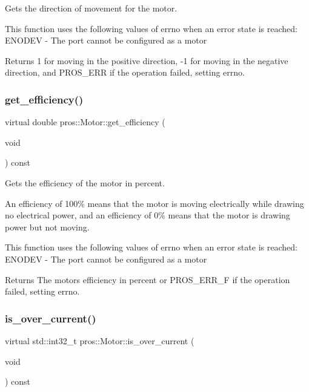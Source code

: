 Gets the direction of movement for the motor. 

This function uses the following values of errno when an error state is reached\+: E\+N\+O\+D\+EV -\/ The port cannot be configured as a motor

\begin{DoxyReturn}{Returns}
1 for moving in the positive direction, -\/1 for moving in the negative direction, and P\+R\+O\+S\+\_\+\+E\+RR if the operation failed, setting errno. 
\end{DoxyReturn}
\mbox{\label{classpros_1_1Motor_a6f0b39894abf612a1965a66224893c71}} 
\subsubsection{\texorpdfstring{get\+\_\+efficiency()}{get\_efficiency()}}
{\footnotesize\ttfamily virtual double pros\+::\+Motor\+::get\+\_\+efficiency (\begin{DoxyParamCaption}\item[{void}]{ }\end{DoxyParamCaption}) const\hspace{0.3cm}{\ttfamily [virtual]}}



Gets the efficiency of the motor in percent. 

An efficiency of 100\% means that the motor is moving electrically while drawing no electrical power, and an efficiency of 0\% means that the motor is drawing power but not moving.

This function uses the following values of errno when an error state is reached\+: E\+N\+O\+D\+EV -\/ The port cannot be configured as a motor

\begin{DoxyReturn}{Returns}
The motor\textquotesingle{}s efficiency in percent or P\+R\+O\+S\+\_\+\+E\+R\+R\+\_\+F if the operation failed, setting errno. 
\end{DoxyReturn}
\mbox{\label{classpros_1_1Motor_a2d34c92effccfbb4d2f45319bf4bd272}} 
\subsubsection{\texorpdfstring{is\+\_\+over\+\_\+current()}{is\_over\_current()}}
{\footnotesize\ttfamily virtual std\+::int32\+\_\+t pros\+::\+Motor\+::is\+\_\+over\+\_\+current (\begin{DoxyParamCaption}\item[{void}]{ }\end{DoxyParamCaption}) const\hspace{0.3cm}{\ttfamily [virtual]}}



